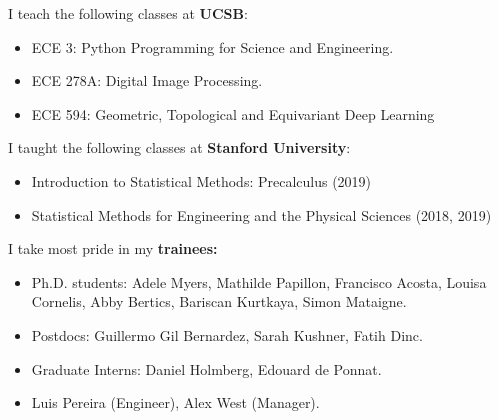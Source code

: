 I teach the following classes at \textbf{UCSB}:
\vspace{-2mm}
\begin{itemize}[leftmargin=*,itemsep=0.2em,topsep=0.2em,parsep=0pt,partopsep=0pt]
    \item ECE 3: Python Programming for Science and Engineering.
    \item ECE 278A: Digital Image Processing.
    \item ECE 594: Geometric, Topological and Equivariant Deep Learning
\end{itemize}

I taught the following classes at \textbf{Stanford University}:
\vspace{-2mm}

\begin{itemize}[leftmargin=*,itemsep=0.2em,topsep=0.2em,parsep=0pt,partopsep=0pt]
    \item Introduction to Statistical Methods: Precalculus (2019)
    \item Statistical Methods for Engineering and the Physical Sciences (2018, 2019)
\end{itemize}

I take most pride in my \textbf{trainees:}
\vspace{-2mm}
\begin{itemize}[leftmargin=*,itemsep=0.2em,topsep=0.2em,parsep=0pt,partopsep=0pt]
    \item Ph.D. students: Adele Myers, Mathilde Papillon, Francisco Acosta, Louisa Cornelis, Abby Bertics, Bariscan Kurtkaya, Simon Mataigne.
    \item Postdocs: Guillermo Gil Bernardez, Sarah Kushner, Fatih Dinc.
    \item Graduate Interns: Daniel Holmberg, Edouard de Ponnat.
    \item Luis Pereira (Engineer), Alex West (Manager).
\end{itemize}
\vspace{2mm}